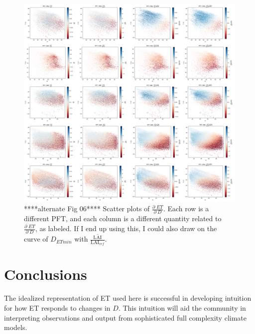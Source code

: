 \documentclass[draft,linenumbers]{agujournal}
\begin{document}
\begin{figure}[h]
\centering
\includegraphics[width=\textwidth]{./fig06b.png}
\caption{****alternate Fig 06****  Scatter plots of $\frac{\partial \; ET}{\partial \; D}$. Each row is a different PFT, and each column is a different quantity related to $\frac{\partial \; ET}{\partial \; D}$, as labeled. If I end up using this, I could also draw on the curve of $D_{ETmin}$ with $\overline{\frac{\text{LAI}}{\text{LAI$_{ref}$}}}$. }
\label{real2}
\end{figure}


\section{Conclusions} 

The idealized representation of ET used here is successful in developing intuition for how ET responds to changes in $D$. This intuition will aid the community in interpreting observations and output from sophisticated full complexity climate models.
\end{document}
